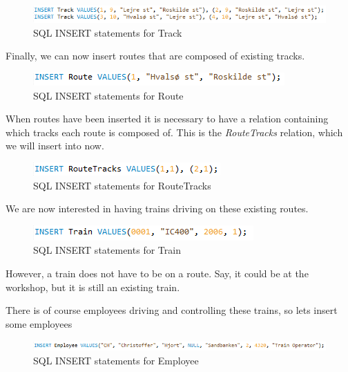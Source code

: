 \begin{figure}[ht!]
    \centering
    \includegraphics[width=1\textwidth]{img/INSERT_Statements_Track}
    \caption{SQL INSERT statements for Track}
\end{figure}

Finally, we can now insert routes that are composed of existing tracks.

\begin{figure}[ht!]
    \centering
    \includegraphics[width=.6\textwidth]{img/INSERT_Statements_Route}
    \caption{SQL INSERT statements for Route}
\end{figure}

When routes have been inserted it is necessary to have a relation containing 
which tracks each route is composed of. This is the \emph{RouteTracks} 
relation, which we will insert into now.

\begin{figure}[ht!]
    \centering
    \includegraphics[width=.5\textwidth]{img/INSERT_Statements_RouteTracks}
    \caption{SQL INSERT statements for RouteTracks}
\end{figure}

We are now interested in having trains driving on these existing routes.

\begin{figure}[ht!]
    \centering
    \includegraphics[width=.5\textwidth]{img/INSERT_Statements_Train}
    \caption{SQL INSERT statements for Train}
\end{figure}

However, a train does not have to be on a route. Say, it could be at the 
workshop, but it is still an existing train.

There is of course employees driving and controlling these trains, so lets 
insert some employees

\begin{figure}[ht!]
    \centering
    \includegraphics[width=1\textwidth]{img/INSERT_Statements_Employee}
    \caption{SQL INSERT statements for Employee}
\end{figure}

